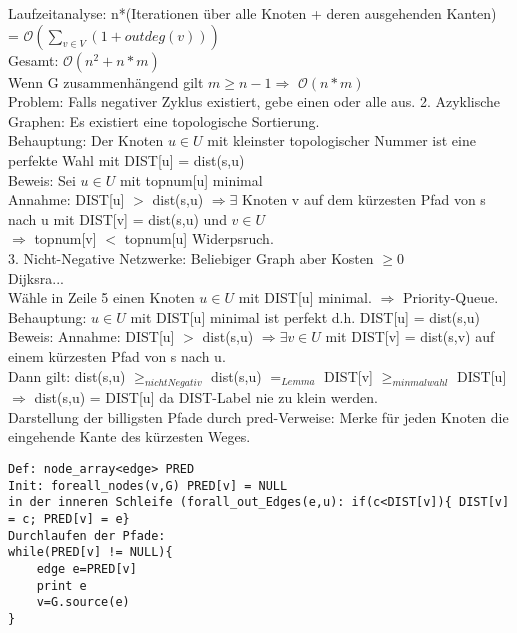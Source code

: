 \documentclass[a4paper]{article}
\newcommand{\oh}[1]{$\mathcal{O}(#1)$}
\newcommand{\pl}{\hspace*{1cm}}
\begin{document}
Laufzeitanalyse: n*(Iterationen über alle Knoten + deren ausgehenden Kanten) = \oh{\sum_{v\in V}(1+outdeg(v))}\\
Gesamt: \oh{n^2+n*m}\\
Wenn G zusammenhängend gilt $m\geq n-1 \Rightarrow$ \oh{n*m}\\
Problem: Falls negativer Zyklus existiert, gebe einen oder alle aus.
2. Azyklische Graphen: Es existiert eine topologische Sortierung.\\
Behauptung: Der Knoten $u\in U$ mit kleinster topologischer Nummer ist eine perfekte Wahl mit DIST[u] = dist(s,u)\\
Beweis: Sei $u\in U$ mit topnum[u] minimal\\
\pl Annahme: DIST[u] $>$ dist(s,u)
\pl $\Rightarrow \exists$ Knoten v auf dem kürzesten Pfad von s nach u mit DIST[v] = dist(s,u) und $v\in U$\\
\pl $\Rightarrow $ topnum[v] $<$ topnum[u] Widerpsruch.\\
3. Nicht-Negative Netzwerke: Beliebiger Graph aber Kosten $\geq 0$\\
Dijksra...\\
Wähle in Zeile 5 einen Knoten $u\in U$ mit DIST[u] minimal. $\Rightarrow$ Priority-Queue.\\
Behauptung: $u\in U$ mit DIST[u] minimal ist perfekt d.h. DIST[u] = dist(s,u)\\
Beweis:
\pl Annahme: DIST[u] $>$ dist(s,u) $\Rightarrow \exists v\in U$ mit DIST[v] = dist(s,v) auf einem kürzesten Pfad von s nach u.\\
\pl Dann gilt: dist(s,u) $\geq_{nichtNegativ}$ dist(s,u) $=_{Lemma}$ DIST[v] $\geq_{minmalwahl} $ DIST[u]\\
\pl $\Rightarrow$ dist(s,u) = DIST[u] da DIST-Label nie zu klein werden.\\

Darstellung der billigsten Pfade durch pred-Verweise: Merke für jeden Knoten die eingehende Kante des kürzesten Weges.
\begin{lstlisting}
Def: node_array<edge> PRED
Init: foreall_nodes(v,G) PRED[v] = NULL
in der inneren Schleife (forall_out_Edges(e,u): if(c<DIST[v]){ DIST[v] = c; PRED[v] = e}
Durchlaufen der Pfade:
while(PRED[v] != NULL){
	edge e=PRED[v]
	print e 
	v=G.source(e)
}
\end{lstlisting}
\end{document}
